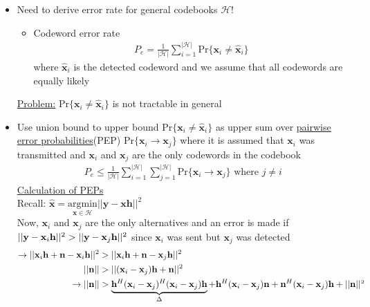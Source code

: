 \documentclass[a4paper, 10pt]{article}
\begin{document}
\begin{itemize}
	\item Need to derive error rate for general codebooks $\mathscr{H}$!
	\begin{itemize}
		\item Codeword error rate\\
		\begin{align*}
			P_e=\frac{1}{|\mathscr{H}|}\sum\limits_{i=1}^{|\mathscr{H}|}\mathrm{Pr}\{\mathbf{x}_i\neq\hat{\mathbf{x}}_i\}
		\end{align*}
		where $\hat{\mathbf{x}}_i$ is the detected codeword and we assume that all codewords are equally likely
	\end{itemize}
\underline{Problem:} $\mathrm{Pr}\{\mathbf{x}_i\neq\hat{\mathbf{x}}_i\}$ is not tractable in general
	\item  Use union bound to upper bound $\mathrm{Pr}\{\mathbf{x}_i\neq\hat{\mathbf{x}}_i\}$ as upper sum over \underline{pairwise error probabilities}(PEP)
	$\mathrm{Pr}\{\mathbf{x}_i\rightarrow\mathbf{x}_j\}$ where it is assumed that $\mathbf{x}_i$ was transmitted and $\mathbf{x}_i$ and $\mathbf{x}_j$ are the
	only codewords in the codebook
	\begin{align*}
	\boxed{P_e\leq \frac{1}{|\mathscr{H}|}\sum\limits_{i=1}^{|\mathscr{H}|}\sum\limits_{j=1}^{|\mathscr{H}|}\mathrm{Pr}\{\mathbf{x}_i\rightarrow\mathbf{x}_j\} \text{ where } j \neq i}
	\end{align*}
\underline{Calculation of PEPs}\\
Recall: $\hat{\mathbf{x}}=\underset{\mathbf{x}\in\mathscr{H}}{\mathrm{argmin}}||\mathbf{y-xh}||^2$\\
Now, $\mathbf{x}_i$ and $\mathbf{x}_j$ are the only alternatives and an error is made if $||\mathbf{y-x_{\mathnormal{i}}h}||^2>||\mathbf{y-x_{\mathnormal{j}}h}||^2$ since $\mathbf{x}_i$ was sent but $\mathbf{x}_j$ was detected
	\begin{align*}
	\rightarrow	||\mathbf{x_{\mathnormal{i}}h+n-x_{\mathnormal{i}}h}||^2 &>||\mathbf{x_{\mathnormal{i}}h+n-x_{\mathnormal{j}}h}||^2\\
			||\mathbf{n}||&>||\mathbf{(x_{\mathnormal{i}}-x_{\mathnormal{j}})h+n}||^2\\
	\rightarrow	||\mathbf{n}||&>\underbrace{\mathbf{h^{\mathnormal{H}}(x_{\mathnormal{i}}-x_{\mathnormal{j}})^{\mathnormal{H}}(x_{\mathnormal{i}}-x_{\mathnormal{j}})h}}_{\Delta}
			+\mathbf{h^{\mathnormal{H}}(x_{\mathnormal{i}}-x_{\mathnormal{j}})n+n^{\mathnormal{H}}(x_{\mathnormal{i}}-x_{\mathnormal{j}})h+||n||^{\mathnormal{2}}}

\end{align*}
\end{itemize}
\end{document}
